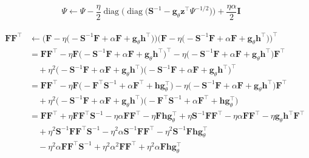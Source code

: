 \documentclass[msc,deptreport.inf]{infthesis} %
\newcommand{\matr}[1]{\mathbf{#1}}
\newcommand{\diag}{\mathop{\mathrm{diag}}}
\begin{document}
\begin{equation}
	\Psi \leftarrow \Psi - \frac{\eta}{2} \diag\Big(\diag\big(\matr{S}^{-1} - \matr{g}_\theta \matr{z}^\intercal \Psi^{-1/2}\big)\Big) +  \frac{\eta \alpha}{2}\matr{I}
\end{equation}

\begin{align}
\begin{split}
	\matr{F}\matr{F}^\intercal
	& \leftarrow \Big(\matr{F} - \eta \big(-\matr{S}^{-1} \matr{F} + \alpha \matr{F} + \matr{g}_\theta \matr{h}^\intercal \big)\Big) \Big(\matr{F} - \eta \big(-\matr{S}^{-1} \matr{F} + \alpha \matr{F} + \matr{g}_\theta \matr{h}^\intercal \big)\Big)^\intercal \\
	& = \matr{F}\matr{F}^\intercal 
	- \eta \matr{F} \big(-\matr{S}^{-1} \matr{F} + \alpha \matr{F} + \matr{g}_\theta \matr{h}^\intercal \big)^\intercal
	- \eta \big(-\matr{S}^{-1} \matr{F} + \alpha \matr{F} + \matr{g}_\theta \matr{h}^\intercal \big) \matr{F}^\intercal \\
	& \quad + \eta^2 \big(-\matr{S}^{-1} \matr{F} + \alpha \matr{F} + \matr{g}_\theta \matr{h}^\intercal \big) \big(-\matr{S}^{-1} \matr{F} + \alpha \matr{F} + \matr{g}_\theta \matr{h}^\intercal \big)^\intercal \\
	& = \matr{F}\matr{F}^\intercal 
	- \eta \matr{F} \big(-\matr{F}^\intercal \matr{S}^{-1} + \alpha \matr{F}^\intercal + \matr{h} \matr{g}_\theta^\intercal \big)
	- \eta \big(-\matr{S}^{-1} \matr{F} + \alpha \matr{F} + \matr{g}_\theta \matr{h}^\intercal \big) \matr{F}^\intercal \\
	& \quad + \eta^2 \big(-\matr{S}^{-1} \matr{F} + \alpha \matr{F} + \matr{g}_\theta \matr{h}^\intercal \big) \big(-\matr{F}^\intercal \matr{S}^{-1} + \alpha \matr{F}^\intercal + \matr{h} \matr{g}_\theta^\intercal \big) \\
	& = \matr{F}\matr{F}^\intercal  
	+ \eta \matr{F} \matr{F}^\intercal \matr{S}^{-1} - \eta \alpha \matr{F} \matr{F}^\intercal - \eta \matr{F} \matr{h} \matr{g}_\theta^\intercal
	+ \eta \matr{S}^{-1} \matr{F} \matr{F}^\intercal - \eta \alpha \matr{F} \matr{F}^\intercal - \eta \matr{g}_\theta \matr{h}^\intercal \matr{F}^\intercal \\
	& \quad + \eta^2 \matr{S}^{-1} \matr{F} \matr{F}^\intercal \matr{S}^{-1} - \eta^2 \alpha \matr{S}^{-1} \matr{F} \matr{F}^\intercal - \eta^2 \matr{S}^{-1} \matr{F} \matr{h} \matr{g}_\theta^\intercal \\
	& \quad - \eta^2 \alpha \matr{F} \matr{F}^\intercal \matr{S}^{-1} + \eta^2 \alpha^2 \matr{F} \matr{F}^\intercal + \eta^2 \alpha \matr{F} \matr{h} \matr{g}_\theta^\intercal \\

\end{split}
\end{align}
\end{document}
